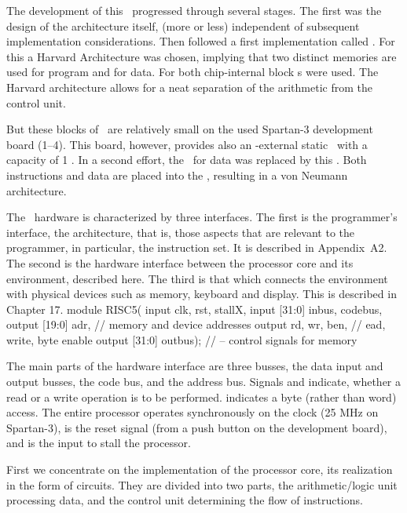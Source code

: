 The development of this \RISC\ progressed through several stages. The first was the design of the architecture itself, (more or less) independent of subsequent implementation considerations. Then followed a first implementation called . For this a Harvard Architecture was chosen, implying that two distinct memories are used for program and for data. For both chip-internal block \RAM{}s were used. The Harvard architecture allows for a neat separation of the arithmetic from the control unit.

But these blocks of \RAM\ are relatively small on the used Spartan-3 development board (1--4\Kwords). This board, however, provides also an \FPGA-external static \RAM\ with a capacity of 1 \MB. In a second effort, the \BRAM\ for data was replaced by this \SRAM. Both instructions and data are placed into the \SRAM, resulting in a von Neumann architecture.

The \RISC\ hardware is characterized by three interfaces. The first is the programmer's interface, the architecture, that is, those aspects that are relevant to the programmer, in particular, the instruction set. It is described in Appendix~A2. The second is the hardware interface between the processor core and its environment, described here. The third is that which connects the environment with physical devices such as memory, keyboard and display. This is described in Chapter 17.
\begintt
module RISC5(
  input clk, rst, stallX,
  input [31:0] inbus, codebus,
  output [19:0] adr,     // memory and device addresses
  output rd, wr, ben,    // ead, write, byte enable
  output [31:0] outbus); //   -- control signals for memory
\endtt

The main parts of the hardware interface are three busses, the data input and output busses, the code bus, and the address bus. Signals  and  indicate, whether a read or a write operation is to be performed.  indicates a byte (rather than word) access. The entire processor operates synchronously on the clock  (25 MHz on Spartan-3),  is the reset signal (from a push button on the development board), and  is the input to stall the processor.


First we concentrate on the implementation of the processor core, its realization in the form of circuits. They are divided into two parts, the arithmetic/logic unit processing data, and the control unit determining the flow of instructions.

